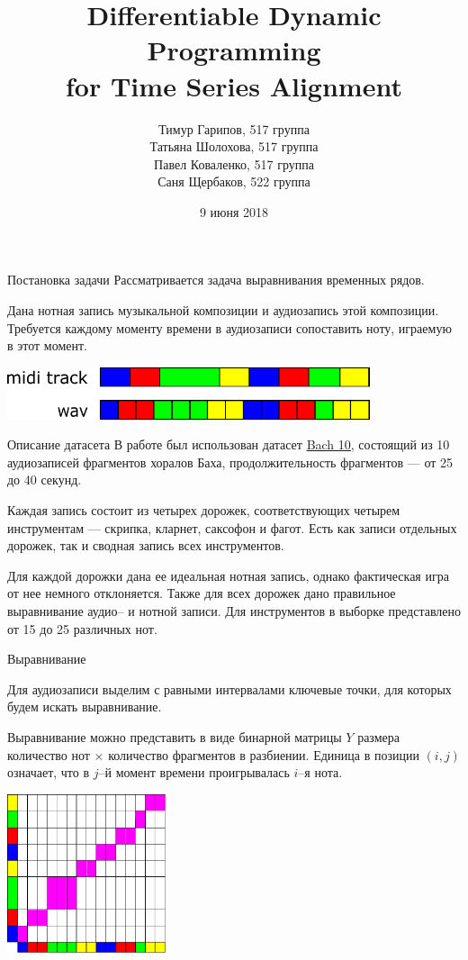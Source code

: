 \documentclass[unicode, dvipsnames]{beamer}
\title[Time Series Alignment]{Differentiable Dynamic Programming \\ for Time Series Alignment}
\author[]{Тимур Гарипов, 517 группа \\ Татьяна Шолохова, 517 группа \\ Павел Коваленко, 517 группа \\ Саня Щербаков, 522 группа}
\date{9 июня 2018}
\begin{document}
\begin{frame}
    \titlepage
\end{frame}

\begin{frame}{Постановка задачи}
	Рассматривается задача выравнивания временных рядов.
	
	\bigskip
	Дана нотная запись музыкальной композиции и аудиозапись этой композиции. Требуется каждому моменту времени в аудиозаписи сопоставить ноту, играемую в этот момент.
	
	\bigskip
	\centering
	\includegraphics[width=0.8\textwidth]{graphics/task.pdf}
\end{frame}

\begin{frame}{Описание датасета}
В работе был использован датасет \href{http://music.cs.northwestern.edu/data/Bach10.html}{Bach 10}, состоящий из 10 аудиозаписей фрагментов хоралов Баха, продолжительность фрагментов --- от 25 до 40 секунд. 

\bigskip
Каждая запись состоит из четырех дорожек, соответствующих четырем инструментам --- скрипка, кларнет, саксофон и фагот. Есть как записи отдельных дорожек, так и сводная запись всех инструментов.

\bigskip
Для каждой дорожки дана ее идеальная нотная запись, однако фактическая игра от нее немного отклоняется. Также для всех дорожек дано правильное выравнивание аудио-- и нотной записи. Для инструментов в выборке представлено от 15 до 25 различных нот.

\end{frame}

\begin{frame}{Выравнивание}

Для аудиозаписи выделим с равными интервалами ключевые точки, для которых будем искать выравнивание. 

Выравнивание можно представить в виде бинарной матрицы $Y$ размера количество нот $\times$ количество фрагментов в разбиении. Единица в позиции $(i, j)$ означает, что в $j$--й момент времени проигрывалась $i$--я нота.

\bigskip
\centering
\includegraphics[width=0.35\textwidth]{graphics/task2.pdf}
\end{frame}
\end{document}
